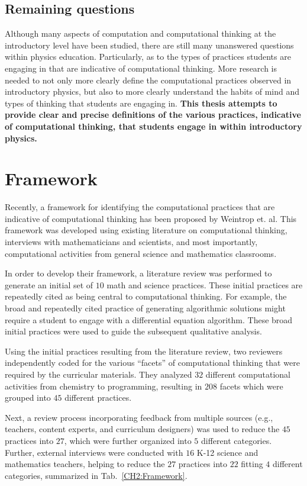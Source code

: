 \documentclass{msuphddissertation}
\begin{document}
\begin{doublespace}
\subsection{Remaining questions}

Although many aspects of computation and computational thinking at the introductory level have been studied, there are still many unanswered questions within physics education.  Particularly, as to the types of practices students are engaging in that are indicative of computational thinking.  More research is needed to not only more clearly define the computational practices observed in introductory physics, but also to more clearly understand the habits of mind and types of thinking that students are engaging in.  \textbf{This thesis attempts to provide clear and precise definitions of the various practices, indicative of computational thinking, that students engage in within introductory physics.}

\section{Framework}

Recently, a framework for identifying the computational practices that are indicative of computational thinking has been proposed by Weintrop et. al.  This framework was developed using existing literature on computational thinking, interviews with mathematicians and scientists, and most importantly, computational activities from general science and mathematics classrooms.

In order to develop their framework, a literature review was performed to generate an initial set of $10$ math and science practices.  These initial practices are repeatedly cited as being central to computational thinking.  For example, the broad and repeatedly cited practice of generating algorithmic solutions might require a student to engage with a differential equation algorithm.  These broad initial practices were used to guide the subsequent qualitative analysis.

Using the initial practices resulting from the literature review, two reviewers independently coded for the various ``facets'' of computational thinking that were required by the curricular materials.  They analyzed $32$ different computational activities from chemistry to programming, resulting in $208$ facets which were grouped into $45$ different practices.

Next, a review process incorporating feedback from multiple sources (e.g., teachers, content experts, and curriculum designers) was used to reduce the $45$ practices into $27$, which were further organized into $5$ different categories.  Further, external interviews were conducted with $16$ K-12 science and mathematics teachers, helping to reduce the $27$ practices into $22$ fitting $4$ different categories, summarized in Tab.~\ref{CH2:Framework}.


\end{doublespace}
\end{document}
